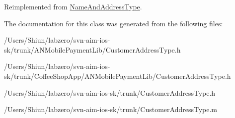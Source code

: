 Reimplemented from \hyperlink{interface_name_and_address_type_ab8321d353b3ec46068dd808f03db1d72}{NameAndAddressType}.



The documentation for this class was generated from the following files:\begin{DoxyCompactItemize}
\item 
/Users/Shiun/labzero/svn-\/aim-\/ios-\/sk/trunk/ANMobilePaymentLib/CustomerAddressType.h\item 
/Users/Shiun/labzero/svn-\/aim-\/ios-\/sk/trunk/CoffeeShopApp/ANMobilePaymentLib/CustomerAddressType.h\item 
/Users/Shiun/labzero/svn-\/aim-\/ios-\/sk/trunk/CustomerAddressType.h\item 
/Users/Shiun/labzero/svn-\/aim-\/ios-\/sk/trunk/CustomerAddressType.m\end{DoxyCompactItemize}
